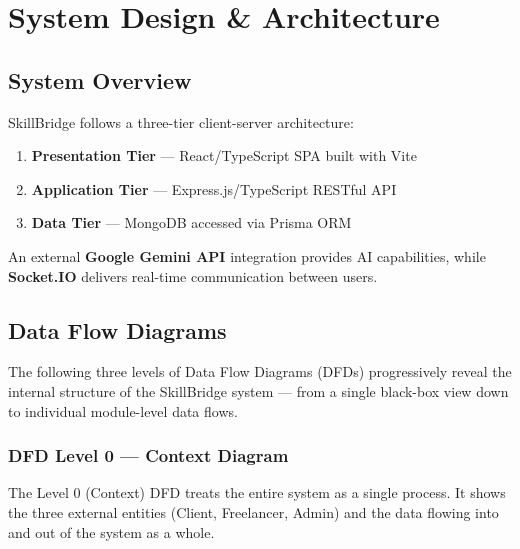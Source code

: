 
\chapter{System Design \& Architecture}
\label{Chapter3}

\section{System Overview}

SkillBridge follows a three-tier client-server architecture:

\begin{enumerate}
  \item \textbf{Presentation Tier} — React/TypeScript SPA built with Vite
  \item \textbf{Application Tier} — Express.js/TypeScript RESTful API
  \item \textbf{Data Tier} — MongoDB accessed via Prisma ORM
\end{enumerate}

An external \textbf{Google Gemini API} integration provides AI capabilities, while
\textbf{Socket.IO} delivers real-time communication between users.

\section{Data Flow Diagrams}
\label{sec:dfd}

The following three levels of Data Flow Diagrams (DFDs) progressively reveal the internal
structure of the SkillBridge system — from a single black-box view down to individual
module-level data flows.

\subsection{DFD Level 0 — Context Diagram}

The Level 0 (Context) DFD treats the entire system as a single process. It shows the three
external entities (Client, Freelancer, Admin) and the data flowing into and out of the
system as a whole.

